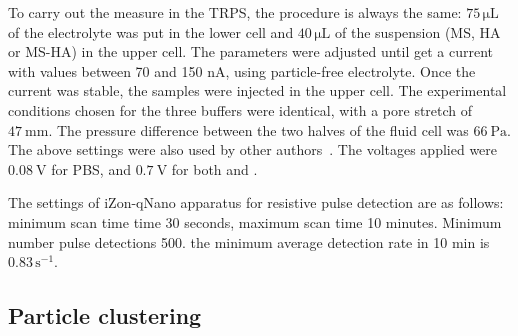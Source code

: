 \documentclass[journal=langd5,manuscript=article]{achemso}
\begin{document}
To carry out the measure in the TRPS, the procedure is always the same: $\mathrm{75 \,\mu L}$ of the electrolyte was put in the lower cell and $\mathrm{40 \,\mu L}$  of the suspension (MS, HA or MS-HA) in the upper cell. The parameters were adjusted until get a current with values between 70 and 150 nA, using particle-free electrolyte. Once the current was stable, the samples were injected in the upper cell. The experimental conditions chosen for the three buffers  were identical, with a pore stretch of $47~\mathrm{mm}$. The pressure difference between the two halves of the fluid cell was $66~\mathrm{Pa}$. The above settings were also used by other authors~\cite{Weatherall2016}. The voltages applied were  $0.08~\mathrm{V}$ for PBS, and  $0.7~\mathrm{V}$ for both  and . 
	



The settings of iZon-qNano apparatus  for resistive pulse detection are as follows: minimum scan time  time 30 seconds, maximum scan time  10 minutes. Minimum number pulse detections 500. the minimum average detection  rate in 10 min is  $\mathrm{0.83\, s^{-1}}$. 












\subsection{Particle clustering}
\end{document}
